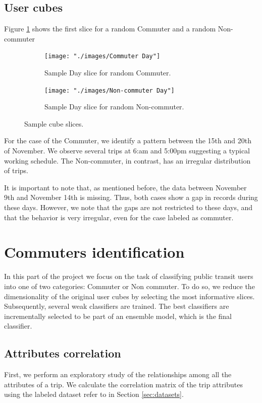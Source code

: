 \documentclass{article}
\begin{document}
\subsection{User cubes}
Figure \ref{fig:preprocessing/cubes} shows the first slice for a random Commuter and a random Non-commuter


\begin{figure}[H]
  \centering
  \begin{subfigure}[b]{.7\textwidth}
  	\centering
	\texttt{[image: "./images/Commuter Day"]}
  	\caption{Sample Day slice for random Commuter.}
  \end{subfigure}
  \begin{subfigure}[b]{.7\textwidth}
  	\centering
	\texttt{[image: "./images/Non-commuter Day"]}
  	\caption{Sample Day slice for random Non-commuter.}
  \end{subfigure}
  \caption{Sample cube slices.}
  	\label{fig:preprocessing/cubes} %
\end{figure}

For the case of the Commuter, we identify a pattern between the 15th and 20th of November. We observe several trips at 6:am and 5:00pm suggesting a typical working schedule. The Non-commuter, in contrast, has an irregular distribution of trips. 

It is important to note that, as mentioned before, the data between November 9th and November 14th is missing. Thus, both cases show a gap in records during these days. However, we note that the gaps are not restricted to these days, and that the behavior is very irregular, even for the case labeled as commuter. 


\newpage
\section{Commuters identification}
\label{sec:partII}
In this part of the project we focus on the task of classifying public transit users into one of two categories: Commuter or Non commuter. To do so, we reduce the dimensionality of the original user cubes by selecting the most informative slices. Subsequently, several weak classifiers are trained. The best classifiers are incrementally selected to be part of an ensemble model, which is the final classifier.

\subsection{Attributes correlation} %
First, we perform an exploratory study of the relationships among all the attributes of a trip. We calculate the correlation matrix of the trip attributes using the labeled dataset refer to in Section \ref{sec:datasets}.
\end{document}
